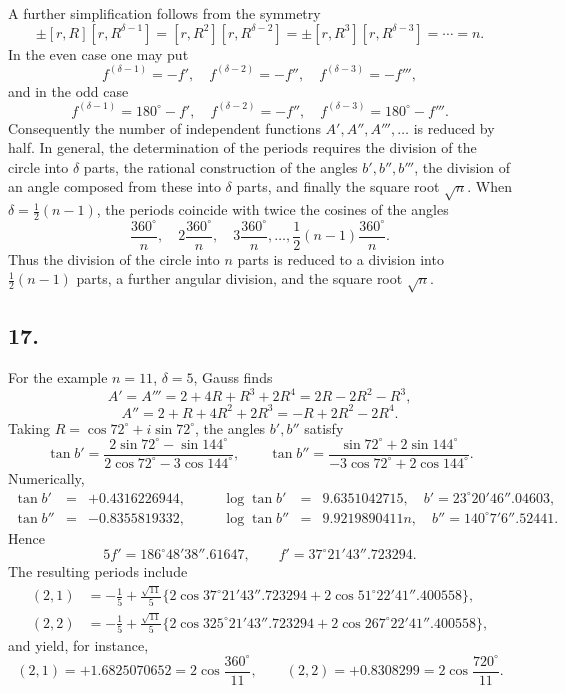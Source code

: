 \documentclass[12pt]{article}
\begin{document}
A further simplification follows from the symmetry
\[
\pm [r,R][r,R^{\delta-1}]=[r,R^2][r,R^{\delta-2}]=\pm[r,R^3][r,R^{\delta-3}]=\cdots=n.
\]
In the even case one may put
\[
f^{(\delta-1)}=-f',\quad f^{(\delta-2)}=-f'',\quad f^{(\delta-3)}=-f''',
\]
and in the odd case
\[
f^{(\delta-1)}=180^\circ-f',\quad f^{(\delta-2)}=-f'',\quad
f^{(\delta-3)}=180^\circ-f'''.
\]
Consequently the number of independent functions $A',A'',A''',\ldots$ is reduced by half. In general, the determination of the periods requires the division of the circle into $\delta$ parts, the rational construction of the angles $b',b'',b'''$, the division of an angle composed from these into $\delta$ parts, and finally the square root $\sqrt n$. When $\delta=\frac12(n-1)$, the periods coincide with twice the cosines of the angles
\[
\frac{360^\circ}{n},\quad 2\frac{360^\circ}{n},\quad 3\frac{360^\circ}{n},\ldots,\frac12(n-1)\frac{360^\circ}{n}.
\]
Thus the division of the circle into $n$ parts is reduced to a division into $\frac12(n-1)$ parts, a further angular division, and the square root $\sqrt n$.

\subsection*{17.}

For the example $n=11$, $\delta=5$, Gauss finds
\[
A'=A'''=2+4R+R^3+2R^4=2R-2R^2-R^3,
\]
\[
A''=2+R+4R^2+2R^3=-R+2R^2-2R^4.
\]
Taking $R=\cos72^\circ+i\sin72^\circ$, the angles $b',b''$ satisfy
\[
\tan b'=\frac{2\sin72^\circ-\sin144^\circ}{2\cos72^\circ-3\cos144^\circ},\qquad
\tan b''=\frac{\sin72^\circ+2\sin144^\circ}{-3\cos72^\circ+2\cos144^\circ}.
\]
Numerically,
\[
\begin{array}{rclcrcl}
\tan b'&=&+0.4316226944,&\quad&\log\tan b'&=&9.6351042715,\quad b'=23^\circ20'46''.04603,\\
\tan b''&=&-0.8355819332,&\quad&\log\tan b''&=&9.9219890411n,\quad b''=140^\circ7'6''.52441.
\end{array}
\]
Hence
\[
5f'=186^\circ48'38''.61647,\qquad f'=37^\circ21'43''.723294.
\]
The resulting periods include
\[
\begin{aligned}
(2,1)&=-\frac15+\frac{\sqrt{11}}5\{2\cos37^\circ21'43''.723294+2\cos51^\circ22'41''.400558\},\\
(2,2)&=-\frac15+\frac{\sqrt{11}}5\{2\cos325^\circ21'43''.723294+2\cos267^\circ22'41''.400558\},
\end{aligned}
\]
and yield, for instance,
\[
(2,1)=+1.6825070652=2\cos\frac{360^\circ}{11},\qquad
(2,2)=+0.8308299=2\cos\frac{720^\circ}{11}.
\]
\end{document}
